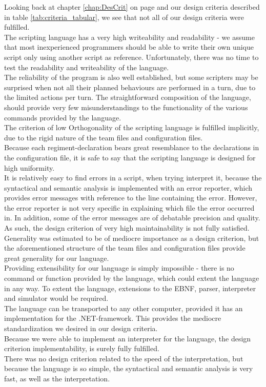 	Looking back at chapter \ref{chap:DesCrit} on page \pageref{chap:DesCrit} and our design criteria described in table \ref{tab:criteria_tabular}, we see that not all of our design criteria were fulfilled. \\
	The scripting language has a very high writeability and readability - we assume that most inexperienced programmers should be able to write their own unique script only using another script as reference. Unfortunately, there was no time to test the readability and writeability of the language. \\
	The reliability of the program is also well established, but some scripters may be surprised when not all their planned behaviours are performed in a turn, due to the limited actions per turn. The straightforward composition of the language, should provide very few misunderstandings to the functionality of the various commands provided by the language.\\
	The criterion of low Orthogonality of the scripting language is fulfilled implicitly, due to the rigid nature of the team files and configuration files.\\ 
	Because each regiment-declaration bears great resemblance to the declarations in the configuration file, it is safe to say that the scripting language is designed for high uniformity. \\
	It is relatively easy to find errors in a script, when trying interpret it, because the syntactical and semantic analysis is implemented with an error reporter, which provides error messages with reference to the line containing the error. However, the error reporter is not very specific in explaining which file the error occurred in. In addition, some of the error messages are of debatable precision and quality. As such, the design criterion of very high maintainability is not fully satisfied.\\
	Generality was estimated to be of mediocre importance as a design criterion, but the aforementioned structure of the team files and configuration files provide great generality for our language.\\
	Providing extensibility for our language is simply impossible - there is no command or function provided by the language, which could extent the language in any way. To extent the language, extensions to the EBNF, parser, interpreter and simulator would be required. \\
	The language can be transported to any other computer, provided it has an implementation for the .NET-framework. This provides the mediocre standardization we desired in our design criteria.\\
	Because we were able to implement an interpreter for the language, the design criterion implementability, is surely fully fulfilled.\\
	There was no design criterion related to the speed of the interpretation, but because the language is so simple, the syntactical and semantic analysis is very fast, as well as the interpretation. \\
	
